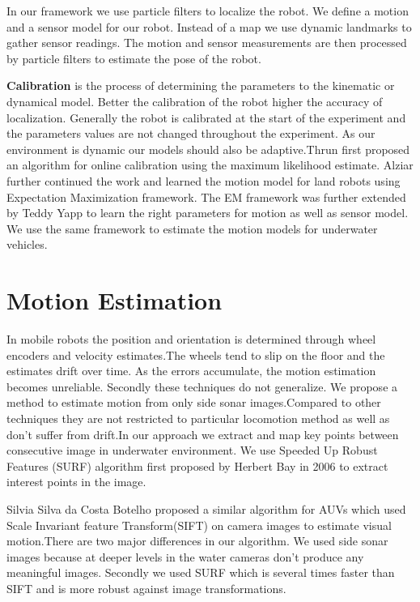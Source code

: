 \documentclass[12pt]{dalcsthesis}
\begin{document}
In our framework we use particle filters to localize the robot. We define a motion and a sensor model for our robot. Instead of a map we use dynamic landmarks to gather sensor readings. The motion and sensor measurements are then processed by particle filters to estimate the pose of the robot. 

\textbf{Calibration} is the process of determining the parameters to the kinematic or dynamical model. Better the calibration of the robot higher the accuracy of localization. Generally the robot is calibrated at the start of the experiment and the parameters values are not changed throughout the experiment. As our environment is dynamic our models should also be adaptive.Thrun first proposed an algorithm for online calibration using the maximum likelihood estimate. Alziar further continued the work and learned the motion model for land robots using Expectation Maximization framework. The EM framework was further extended by Teddy Yapp to learn the right parameters for motion as well as sensor model. We use the same framework to estimate the motion models for underwater vehicles.%



\section{Motion Estimation}
In mobile robots the position and orientation is determined through wheel encoders and velocity estimates.The wheels tend to slip on the floor and the estimates drift over time. As the errors accumulate, the motion estimation becomes unreliable. Secondly these techniques do not generalize. 
We propose a method to estimate motion from only side sonar images.Compared to other techniques they are not restricted to particular locomotion method as well as don't suffer from drift.In our approach we extract and map key points between consecutive image in underwater environment. We use Speeded Up Robust Features (SURF) algorithm first proposed by Herbert Bay in 2006 to extract interest points in the image. 

Silvia Silva da Costa Botelho proposed a similar algorithm for AUVs which used Scale Invariant feature Transform(SIFT) on camera images to estimate visual motion.There are two major differences in our algorithm. We used side sonar images because at deeper levels in the water cameras don't produce any meaningful images. Secondly we used SURF which is several times faster than SIFT and is more robust against image transformations.
\end{document}
